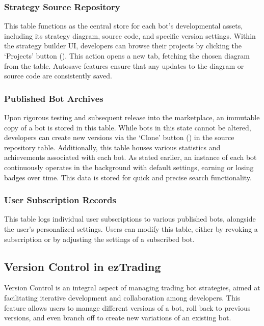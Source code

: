 \subsubsection{Strategy Source Repository}
This table functions as the central store for each bot's developmental assets, including its strategy diagram, source code, and specific version settings. Within the strategy builder UI, developers can browse their projects by clicking the `Projects' button (). This action opens a new tab, fetching the chosen diagram from the table. Autosave features ensure that any updates to the diagram or source code are consistently saved.

\subsubsection{Published Bot Archives}
Upon rigorous testing and subsequent release into the marketplace, an immutable copy of a bot is stored in this table. While bots in this state cannot be altered, developers can create new versions via the `Clone' button () in the source repository table. Additionally, this table houses various statistics and achievements associated with each bot. As stated earlier, an instance of each bot continuously operates in the background with default settings, earning or losing badges over time. This data is stored for quick and precise search functionality.

\subsubsection{User Subscription Records}
This table logs individual user subscriptions to various published bots, alongside the user's personalized settings. Users can modify this table, either by revoking a subscription or by adjusting the settings of a subscribed bot.

\subsection{Version Control in ezTrading}
\label{sec:version-control}

Version Control is an integral aspect of managing trading bot strategies, aimed at facilitating iterative development and collaboration among developers. This feature allows users to manage different versions of a bot, roll back to previous versions, and even branch off to create new variations of an existing bot.

